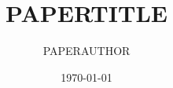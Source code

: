 \documentclass[reprint, aps, prd, nofootinbib]{revtex4-2}
\begin{document}
\title{PAPERTITLE}

\author{PAPERAUTHOR}

\date{\today}

\begin{abstract}

\end{abstract}

\maketitle


\end{document}
